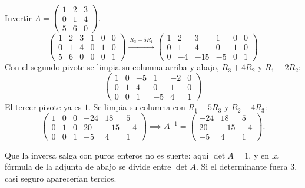 \documentclass[11pt,letterpaper]{article}
\begin{document}
\begin{ejemplo}
    Invertir
    $A = \begin{pmatrix} 1 & 2 & 3 \\ 0 & 1 & 4 \\ 5 & 6 & 0
    \end{pmatrix}$.
    \[
        \left(\begin{array}{ccc|ccc}
            1 & 2 & 3 & 1 & 0 & 0 \\
            0 & 1 & 4 & 0 & 1 & 0 \\
            5 & 6 & 0 & 0 & 0 & 1
        \end{array}\right)
        \xrightarrow{\,R_3 - 5R_1\,}
        \left(\begin{array}{ccc|ccc}
            1 &  2 &   3 &  1 & 0 & 0 \\
            0 &  1 &   4 &  0 & 1 & 0 \\
            0 & -4 & -15 & -5 & 0 & 1
        \end{array}\right)
    \]
    Con el segundo pivote se limpia su columna arriba y abajo,
    $R_3 + 4R_2$ y $R_1 - 2R_2$:
    \[
        \left(\begin{array}{ccc|ccc}
            1 & 0 & -5 &  1 & -2 & 0 \\
            0 & 1 &  4 &  0 &  1 & 0 \\
            0 & 0 &  1 & -5 &  4 & 1
        \end{array}\right)
    \]
    El tercer pivote ya es $1$. Se limpia su columna con
    $R_1 + 5R_3$ y $R_2 - 4R_3$:
    \[
        \left(\begin{array}{ccc|ccc}
            1 & 0 & 0 & -24 &  18 &  5 \\
            0 & 1 & 0 &  20 & -15 & -4 \\
            0 & 0 & 1 &  -5 &   4 &  1
        \end{array}\right)
        \implies
        A^{-1} = \begin{pmatrix}
            -24 &  18 &  5 \\
             20 & -15 & -4 \\
             -5 &   4 &  1
        \end{pmatrix} .
    \]
\end{ejemplo}

\begin{idea}
    Que la inversa salga con puros enteros no es suerte: aquí
    $\det A = 1$, y en la fórmula de la adjunta de abajo se divide
    entre $\det A$. Si el determinante fuera $3$, casi seguro
    aparecerían tercios.
\end{idea}
\end{document}
